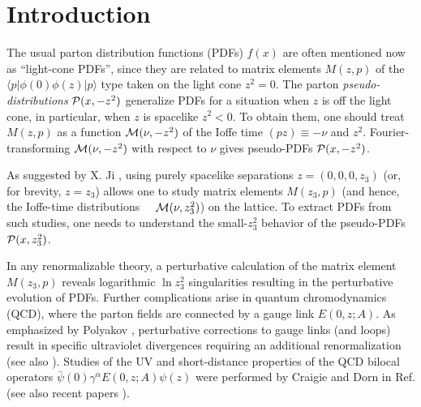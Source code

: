 \documentclass[final,5p,times,twocolumn]{elsarticle}
\begin{document}
\maketitle



















\section{
 Introduction}
 
 
The usual parton distribution functions (PDFs) $f(x)$ \cite{Feynman:1973xc}  
are often mentioned  now as ``light-cone PDFs'',
since they 
are  related to   matrix elements $M(z,p)$ of    the $\langle  p | \phi (0)  \phi(z)  | p \rangle $
type taken 
 on   the light cone $z^2=0$.
 The parton {\it pseudo-distributions}  ${\cal P} (x, -z^2)$  \cite{Radyushkin:2017cyf,Radyushkin:2017sfi} 
 generalize PDFs for a situation when $z$ is off the light cone,
 in particular, when $z$ is  spacelike $z^2 <  0 $.  To obtain them,
 one should treat $M(z,p) $ as a function  ${\cal M} (\nu, -z^2)$ 
 of the Ioffe time $(pz)\equiv  -\nu$ \cite{Ioffe:1969kf} 
 and $z^2$. Fourier-transforming  ${\cal M} (\nu, -z^2)$ with respect to $\nu$
 gives pseudo-PDFs ${\cal P} (x, -z^2)$.  
  
  As  suggested by X. Ji \cite{Ji:2013dva},  
  using  purely spacelike
separations $z=(0,0,0,z_3)$ (or, for brevity, $z=z_3$) allows  one to study 
matrix elements $M(z_3,p) $  (and hence, the 
Ioffe-time \mbox{distributions   \cite{Braun:1994jq} }   ${\cal M} (\nu, z_3^2)$)  on the lattice.
To extract PDFs from such studies, 
one needs  to  understand  the small-$z_3^2$ 
behavior of the pseudo-PDFs ${\cal P} (x, z_3^2)$.  




In any renormalizable theory,
a perturbative calculation of 
the matrix element $M(z_3,p)$  
reveals   logarithmic $\ln z_3^2$   singularities
resulting in  the  perturbative evolution of PDFs. 
Further complications arise in 
  quantum chromodynamics (QCD), where   the parton fields
are connected by a gauge link $E(0,z;A)$. As emphasized by Polyakov
\cite{Polyakov:1980ca}, 
 perturbative corrections 
to gauge  links (and loops)  result in  specific ultraviolet  divergences
requiring an  additional renormalization
(see  also \cite{Dotsenko:1979wb,Brandt:1981kf,Aoyama:1981ev}).  %
Studies of the UV and short-distance properties 
of  the QCD bilocal operators $\bar \psi (0) \gamma^\alpha E(0,z;A) \psi (z)$
were performed
by Craigie and Dorn   %
 in Ref. \cite{Craigie:1980qs}
 (see also  recent papers \cite{Ishikawa:2017faj,Ji:2017oey,Green:2017xeu}). %
 
\end{document}
